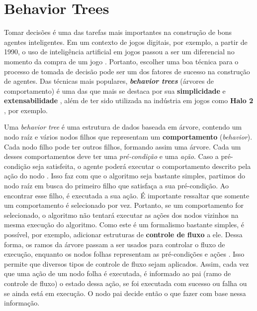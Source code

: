 \chapter{\label{chap:behavior-trees}Behavior Trees}

Tomar decisões é uma das tarefas mais importantes na construção de bons
agentes inteligentes. Em um contexto de jogos digitais, por exemplo, a
partir de 1990, o uso de inteligência artificial em jogos passou a ser um
diferencial no momento da compra de um jogo \cite[Cap
1.]{Millington:2009:AIG:1795711}. Portanto, escolher uma boa técnica para
o processo de tomada de decisão pode ser um dos fatores de sucesso na
construção de agentes. Das técnicas mais populares,
\textit{\textbf{behavior trees}} (árvores de comportamento) é uma das que
mais se destaca por sua \textbf{simplicidade} e \textbf{extensabilidade}
\cite[Cap. 4]{Rabin:2013:GAP:2566761}, além de ter sido utilizada na
indústria em jogos como \textbf{Halo 2} \cite[Cap.
5]{Millington:2009:AIG:1795711}, por exemplo.

Uma \textit{behavior tree} é uma estrutura de dados baseada em árvore,
contendo um nodo raíz e vários nodos filhos que representam um
\textbf{comportamento} (\textit{behavior}). Cada nodo filho pode ter
outros filhos, formando assim uma árvore. Cada um desses comportamentos
deve ter uma \textit{pré-condição} e uma \textit{ação}. Caso a
pré-condição seja satisfeita, o agente poderá executar o comportamento
descrito pela ação do nodo \cite[Cap 4.]{Rabin:2013:GAP:2566761}. Isso faz
com que o algoritmo seja bastante simples, partimos do nodo raíz em busca
do primeiro filho que satisfaça a sua pré-condição. Ao encontrar esse
filho, é executada a sua ação. É importante ressaltar que
somente um comportamento é selecionado por vez. Portanto, se um
comportamento for selecionado, o algoritmo não tentará executar as ações
dos nodos vizinhos na mesma execução do algoritmo.
Como este é um formalismo bastante simples, é possível, por exemplo, adicionar
estruturas de \textbf{controle de fluxo} a ele. Dessa forma, os ramos da
árvore passam a ser usados para controlar o fluxo de execução, enquanto os
nodos folhas representam as pré-condições e ações \cite[Cap.
10]{Rabin:2015:GAP:2821138}. Isso permite que diversos tipos de controle
de fluxo sejam aplicados. Assim, cada vez que uma ação de um nodo folha é
executada, é informado ao pai (ramo de controle de fluxo) o estado dessa
ação, se foi executada com sucesso ou falha ou se ainda está em execução.
O nodo pai decide então o que fazer com base nessa informação.


